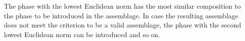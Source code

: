 	The phase with the lowest Euclidean norm has the most similar composition to the phase to be introduced in the assemblage. In case the resulting assemblage does not meet the criterion to be a valid assemblage, the phase with the second lowest Euclidean norm can be introduced and so on.
%
%
%

